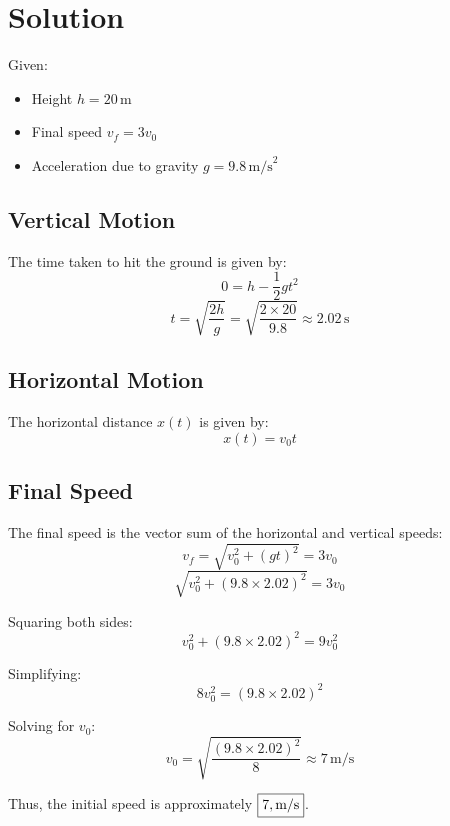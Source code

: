 \documentclass{article}
\begin{document}
\section*{Solution}

Given:
\begin{itemize}
    \item Height \( h = 20 \, \text{m} \)
    \item Final speed \( v_f = 3v_0 \)
    \item Acceleration due to gravity \( g = 9.8 \, \text{m/s}^2 \)
\end{itemize}

\subsection*{Vertical Motion}
The time taken to hit the ground is given by:
\[
0 = h - \frac{1}{2}gt^2
\]
\[
t = \sqrt{\frac{2h}{g}} = \sqrt{\frac{2 \times 20}{9.8}} \approx 2.02 \, \text{s}
\]

\subsection*{Horizontal Motion}
The horizontal distance \( x(t) \) is given by:
\[
x(t) = v_0 t
\]

\subsection*{Final Speed}
The final speed is the vector sum of the horizontal and vertical speeds:
\[
v_f = \sqrt{v_0^2 + (gt)^2} = 3v_0
\]
\[
\sqrt{v_0^2 + (9.8 \times 2.02)^2} = 3v_0
\]

Squaring both sides:
\[
v_0^2 + (9.8 \times 2.02)^2 = 9v_0^2
\]

Simplifying:
\[
8v_0^2 = (9.8 \times 2.02)^2
\]

Solving for $v_0$:
\[
v_0 = \sqrt{\frac{(9.8 \times 2.02)^2}{8}} \approx 7 \, \text{m/s}
\]

Thus, the initial speed is approximately $\boxed{7 \\, \text{m/s}}$.
\end{document}
